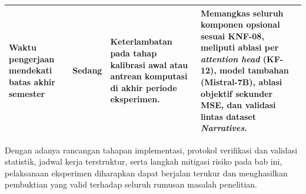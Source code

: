 \begin{table}[h]
\begin{tabularx}{\textwidth}{p{2.9cm} | p{1.6cm} | p{3.6cm} | X}
    \hline
    Waktu pengerjaan mendekati batas akhir semester & Sedang & Keterlambatan pada tahap kalibrasi awal atau antrean komputasi di akhir periode eksperimen. & Memangkas seluruh komponen opsional sesuai KNF-08, meliputi ablasi per \textit{attention head} (KF-12), model tambahan (Mistral-7B), ablasi objektif sekunder MSE, dan validasi lintas dataset \textit{Narratives}. \\
    \hline
  \end{tabularx}
\end{table}

Dengan adanya rancangan tahapan implementasi, protokol verifikasi dan validasi statistik, jadwal kerja terstruktur, serta langkah mitigasi risiko pada bab ini, pelaksanaan eksperimen diharapkan dapat berjalan terukur dan menghasilkan pembuktian yang valid terhadap seluruh rumusan masalah penelitian.